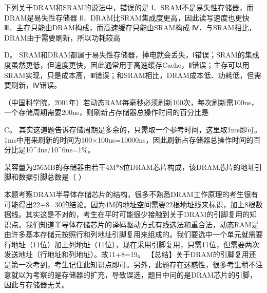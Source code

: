 \question 下列关于DRAM和SRAM的说法中，错误的是
Ⅰ．SRAM不是易失性存储器，而DRAM是易失性存储器
Ⅱ．DRAM比SRAM集成度更高，因此读写速度也更快
Ⅲ．主存只能由DRAM构成，而高速缓存只能由SRAM构成
Ⅳ．与SRAM相比，DRAM由于需要刷新，所以功耗较高
\par{}
\begin{solution}D。
SRAM和DRAM都属于易失性存储器，掉电就会丢失，Ⅰ错误；SRAM的集成度虽然更低，但速度更快，因此通常用于高速缓存Cache，Ⅱ错误；主存可以用SRAM实现，只是成本高，Ⅲ错误；和SRAM相比，DRAM成本低、功耗低，但需要刷新，Ⅳ错误。
\end{solution}
\question （中国科学院，2001年）若动态RAM每毫秒必须刷新100次，每次刷新需100ns，一个存储周期需要200ns，则刷新占存储器总操作时间的百分比是
\par{}
\begin{solution}C。
其实这道题告诉存储周期是多余的，只需取一个参考时间，这里取1ms即可。1ms中用来刷新的时间为100×100ns=10000ns，因此刷新占存储器总操作时间的百分比是10\^{}4ns/10\^{}6ns=1\%。
\end{solution}
\question 某容量为256MB的存储器由若干4M*8位DRAM芯片构成，该DRAM芯片的地址引脚和数据引脚总数是（
）
\par{}
\begin{solution}本题考察DRAM半导体存储芯片的结构，很多不熟悉DRAM工作原理的考生很有可能得出22+8=30的结论。因为4M的地址空间需要22根地址线来标识，加上8根数据线。其实这是不对的，考生在平时可能很少接触到关于DRAM的引脚复用的知识点。我们知道半导体存储芯片的译码驱动方式有线选法和重合法，动态RAM是由许多基本存储元按照行和列地址引脚复用来组成的。我们要选中一个单元就需要行地址（11位）加上列地址（11位），现在采用引脚复用，只需11位，但需要两次发送地址（行地址和列地址）。故11+8=19。
【总结】关于DRAM的引脚复用还是第一次考到，考生记住此知识点即可。另外，此题存在迷惑性，很多考生稍不注意就以为考察的是存储器的扩充，导致误选，题目中问的是DRAM芯片的引脚，因此与存储器无关。
\end{solution}
